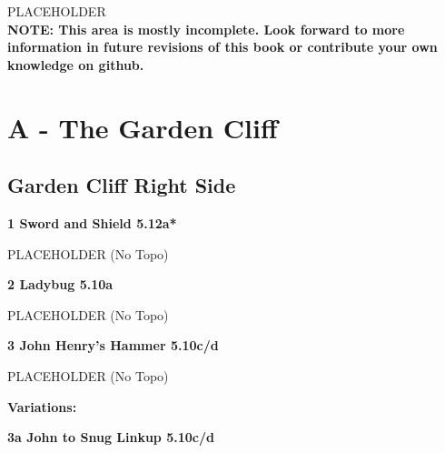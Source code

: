 

\raggedcolumns
\begin{multicols}{2}
PLACEHOLDER\\

\textbf{NOTE: This area is mostly incomplete. Look forward to more information in future revisions of this book or contribute your own knowledge on github.}\\

\newpage
		\section{A - The Garden Cliff}\label{sa:The Garden Cliff}
	
	
			\subsection*{Garden Cliff Right Side}\label{bf:Garden Cliff Right Side}
						
					\label{rt:Sword and Shield}
\colorbox{Goldenrod!50}{
\parbox{0.95\linewidth}{
\textbf{
1 Sword and Shield 5.12a*  
}
}
}

					\begin{adjustwidth}{0.5cm}{}				
					PLACEHOLDER
						\newline (No Topo) 
					\end{adjustwidth}
					\label{rt:Ladybug}
\colorbox{RoyalBlue!20}{
\parbox{0.95\linewidth}{
\textbf{
2 Ladybug 5.10a  
}
}
}

					\begin{adjustwidth}{0.5cm}{}				
					PLACEHOLDER
						\newline (No Topo) 
					\end{adjustwidth}
					\label{rt:John Henry's Hammer}
\colorbox{RoyalBlue!20}{
\parbox{0.95\linewidth}{
\textbf{
3 John Henry's Hammer 5.10c/d    
}
}
}

					\begin{adjustwidth}{0.5cm}{}				
					PLACEHOLDER
						\newline (No Topo) 
					\end{adjustwidth}
						\begin{adjustwidth}{0.5cm}{}				
						\textbf{Variations:} \newline
							\label{vr:John to Snug Linkup}
\colorbox{RoyalBlue!20}{
\parbox{0.95\linewidth}{
\textbf{
3a John to Snug Linkup 5.10c/d    
}
}
}


\end{adjustwidth}
\end{multicols}
